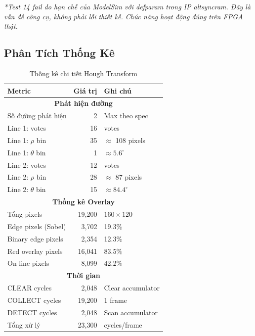 \documentclass[12pt,a4paper]{article}
\begin{document}
\textit{*Test 14 fail do hạn chế của ModelSim với defparam trong IP altsyncram. Đây là vấn đề công cụ, không phải lỗi thiết kế. Chức năng hoạt động đúng trên FPGA thật.}

\subsection{Phân Tích Thống Kê}

\begin{table}[H]
\centering
\caption{Thống kê chi tiết Hough Transform}
\begin{tabular}{|l|r|l|}
\hline
\textbf{Metric} & \textbf{Giá trị} & \textbf{Ghi chú} \\
\hline
\multicolumn{3}{|c|}{\textbf{Phát hiện đường}} \\
\hline
Số đường phát hiện & 2 & Max theo spec \\
\hline
Line 1: votes & 16 & votes \\
\hline
Line 1: $\rho$ bin & 35 & $\approx$ 108 pixels \\
\hline
Line 1: $\theta$ bin & 1 & $\approx 5.6^\circ$ \\
\hline
Line 2: votes & 12 & votes \\
\hline
Line 2: $\rho$ bin & 28 & $\approx$ 87 pixels \\
\hline
Line 2: $\theta$ bin & 15 & $\approx 84.4^\circ$ \\
\hline
\multicolumn{3}{|c|}{\textbf{Thống kê Overlay}} \\
\hline
Tổng pixels & 19,200 & $160 \times 120$ \\
\hline
Edge pixels (Sobel) & 3,702 & 19.3\% \\
\hline
Binary edge pixels & 2,354 & 12.3\% \\
\hline
Red overlay pixels & 16,041 & 83.5\% \\
\hline
On-line pixels & 8,099 & 42.2\% \\
\hline
\multicolumn{3}{|c|}{\textbf{Thời gian}} \\
\hline
CLEAR cycles & 2,048 & Clear accumulator \\
\hline
COLLECT cycles & 19,200 & 1 frame \\
\hline
DETECT cycles & 2,048 & Scan accumulator \\
\hline
Tổng xử lý & 23,300 & cycles/frame \\
\hline
\end{tabular}
\end{table}

\end{document}
